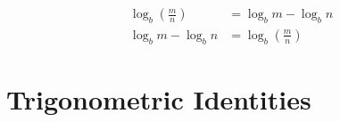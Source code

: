 \documentclass[20150903-160354-rs2.2-MarksMathNotebook.tex]{subfiles}
\begin{document}
\begin{aidentity}
\begin{subequations}
\begin{align}
	\log_b \left( \frac{m}{n} \right) &= \log_b m - \log_b n \label{eq:lqcbpo1}\\
	 \log_b m - \log_b n &= \log_b \left( \frac{m}{n} \right) \label{eq:lqcbpo2}
\end{align}
\end{subequations}
\end{aidentity}


\section{Trigonometric Identities}
\end{document}
